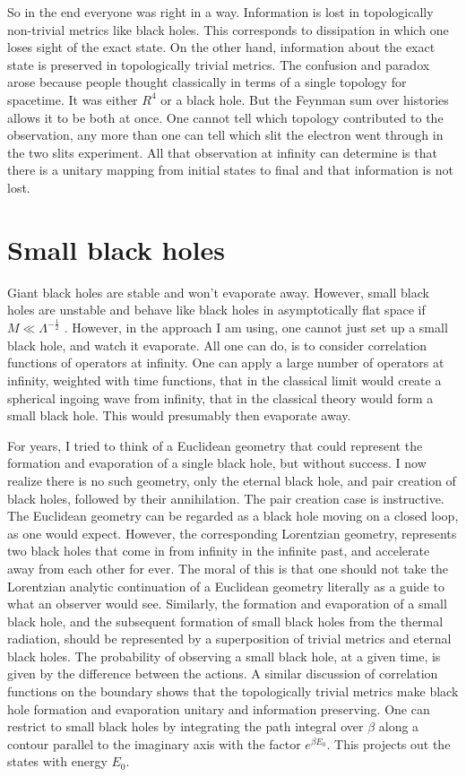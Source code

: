 \documentclass[aps,prd,groupedaddress,showpacs,12pt,nofootinbib]{revtex4-1}
\begin{document}
So in the end everyone was right in a way. Information is lost in topologically non-trivial metrics like black holes. This corresponds to dissipation in which one loses sight of the exact state. On the other hand, information about the exact state is preserved in topologically trivial metrics. The confusion and paradox arose because people thought classically in terms of a single topology for spacetime. It was either $R^4$ or a black hole. But the Feynman sum over histories allows it to be both at once. One cannot tell which topology contributed to the observation, any more than one can tell which slit the electron went through in the two slits experiment. All that observation at infinity can determine is that there is a unitary mapping from initial states to final and that information is not lost. 

\section{Small black holes} 

Giant black holes are stable and won't evaporate away. However, small black holes are unstable and behave like black holes in asymptotically flat space if $M \ll \Lambda^{-\frac{1}{2}}$ \cite{HawkingPage}. However, in the approach I am using, one cannot just set up a small black hole, and watch it evaporate. All one can do, is to consider correlation functions of operators at infinity. One can apply a large number of operators at infinity, weighted with time functions, that in the classical limit would create a spherical ingoing wave from infinity, that in the classical theory would form a small black hole. This would presumably then evaporate away. 

For years, I tried to think of a Euclidean geometry that could represent the formation and evaporation of a single black hole, but without success. I now realize there is no such geometry, only the eternal black hole, and pair creation of black holes, followed by their annihilation. The pair creation case is instructive. The Euclidean geometry can be regarded as a black hole moving on a closed loop, as one would expect. However, the corresponding Lorentzian geometry, represents two black holes that come in from infinity in the infinite past, and accelerate away from each other for ever. The moral of this is that one should not take the Lorentzian analytic continuation of a Euclidean geometry literally as a guide to what an observer would see. Similarly, the formation and evaporation of a small black hole, and the subsequent formation of small black holes from the thermal radiation, should  be represented  by a superposition of trivial metrics and eternal black holes. The probability of observing a small black hole, at a given time, is given by the difference  between the actions. A similar discussion of correlation functions on the boundary shows that the topologically trivial metrics make black hole formation and evaporation unitary and information preserving.
One can restrict to small black holes by integrating the path integral over 
$\beta$ along a contour parallel to the imaginary axis with the factor $e^{\beta E_0}$. This projects  out the states with energy 
$E_0$. 
\end{document}
